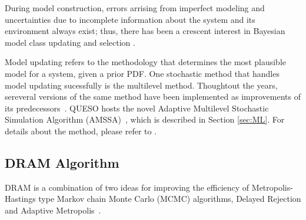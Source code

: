 During model construction, errors arrising from imperfect modeling and uncertainties due to incomplete information about the system and its environment always exist; thus, there has been a crescent interest in Bayesian model class updating  and selection \cite{ChingChen2007,ChOlPr10,CheungPrudencio2012}. 

Model updating refers to the methodology that determines the most plausible model for a system, given a prior PDF. One stochastic method that handles model updating sucessfully is the multilevel method. Thoughtout the years, sereveral versions of the same method have been implemented as improvements of its predecessors~\cite{BeckAu2002,ChingChen2007,CheungPrudencio2012}. QUESO hosts the novel Adaptive Multilevel Stochastic Simulation Algorithm (AMSSA)~\cite{CheungPrudencio2012}, which is described in Section \ref{sec:ML}. For details about the method, please refer to \cite{CheungPrudencio2012}.



\subsection{DRAM Algorithm}\label{sec:DRAM}

DRAM is a combination of two ideas for improving the efficiency of Metropolis-Hastings type Markov chain Monte Carlo (MCMC) algorithms, Delayed Rejection and Adaptive Metropolis~\cite{DRAMtool}. 


